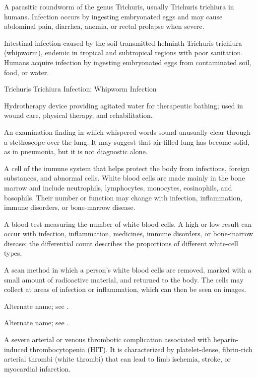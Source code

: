  A parasitic roundworm of the genus Trichuris, usually Trichuris trichiura in humans. Infection occurs by ingesting embryonated eggs and may cause abdominal pain, diarrhea, anemia, or rectal prolapse when severe.

 Intestinal infection caused by the soil-transmitted helminth Trichuris trichiura
(whipworm), endemic in tropical and subtropical regions with poor sanitation. Humans
acquire infection by ingesting embryonated eggs from contaminated soil, food, or water.

\synonyms
Trichuris Trichiura Infection; Whipworm Infection

 Hydrotherapy device providing agitated water for therapeutic bathing; used in wound care, physical therapy, and rehabilitation.

 An examination finding in which whispered words sound unusually clear through a stethoscope over the lung. It may suggest that air-filled lung has become solid, as in pneumonia, but it is not diagnostic alone.

 A cell of the immune system that helps protect the body from infections, foreign substances, and abnormal cells. White blood cells are made mainly in the bone marrow and include neutrophils, lymphocytes, monocytes, eosinophils, and basophils. Their number or function may change with infection, inflammation, immune disorders, or bone-marrow disease.

 A blood test measuring the number of white blood cells. A high or low result can occur with infection, inflammation, medicines, immune disorders, or bone-marrow disease; the differential count describes the proportions of different white-cell types.

 A scan method in which a person's white blood cells are removed, marked with a small amount of radioactive material, and returned to the body. The cells may collect at areas of infection or inflammation, which can then be seen on images.

 Alternate name; see .

 Alternate name; see .

 A severe arterial or venous thrombotic complication associated with heparin-induced thrombocytopenia (HIT). It is characterized by platelet-dense, fibrin-rich arterial thrombi (white thrombi) that can lead to limb ischemia, stroke, or myocardial infarction.

